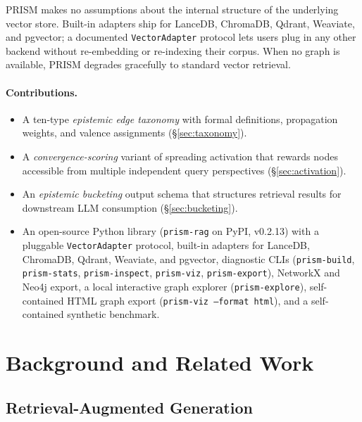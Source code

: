 \documentclass[11pt,a4paper]{article}
\begin{document}
PRISM makes no assumptions about the internal structure of the underlying
vector store. Built-in adapters ship for LanceDB, ChromaDB, Qdrant,
Weaviate, and pgvector; a documented \texttt{VectorAdapter} protocol
lets users plug in any other backend without re-embedding or re-indexing
their corpus. When no graph is available, PRISM degrades gracefully to
standard vector retrieval.

\paragraph{Contributions.}
\begin{itemize}[leftmargin=*]
  \item A ten-type \emph{epistemic edge taxonomy} with formal definitions,
        propagation weights, and valence assignments (\S\ref{sec:taxonomy}).
  \item A \emph{convergence-scoring} variant of spreading activation that
        rewards nodes accessible from multiple independent query perspectives
        (\S\ref{sec:activation}).
  \item An \emph{epistemic bucketing} output schema that structures
        retrieval results for downstream LLM consumption (\S\ref{sec:bucketing}).
  \item An open-source Python library (\texttt{prism-rag} on PyPI, v0.2.13)
        with a pluggable \texttt{VectorAdapter} protocol, built-in adapters
        for LanceDB, ChromaDB, Qdrant, Weaviate, and pgvector, diagnostic
        CLIs (\texttt{prism-build}, \texttt{prism-stats}, \texttt{prism-inspect},
        \texttt{prism-viz}, \texttt{prism-export}), NetworkX and Neo4j export,
        a local interactive graph explorer (\texttt{prism-explore}),
        self-contained HTML graph export (\texttt{prism-viz --format html}),
        and a self-contained synthetic benchmark.
\end{itemize}


\section{Background and Related Work}
\label{sec:background}

\subsection{Retrieval-Augmented Generation}
\end{document}
